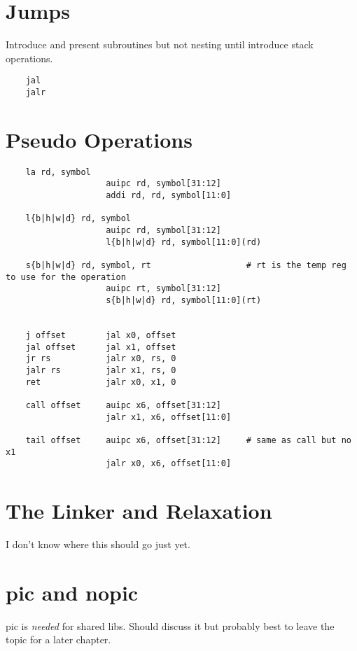 \section{Jumps}

Introduce and present subroutines but not nesting until introduce stack operations.

\begin{verbatim}
    jal
    jalr
\end{verbatim}



\section{Pseudo Operations}

%
\begin{verbatim}
    la rd, symbol
                    auipc rd, symbol[31:12]
                    addi rd, rd, symbol[11:0]

    l{b|h|w|d} rd, symbol
                    auipc rd, symbol[31:12]
                    l{b|h|w|d} rd, symbol[11:0](rd)

    s{b|h|w|d} rd, symbol, rt                   # rt is the temp reg to use for the operation
                    auipc rt, symbol[31:12]
                    s{b|h|w|d} rd, symbol[11:0](rt)


    j offset        jal x0, offset
    jal offset      jal x1, offset
    jr rs           jalr x0, rs, 0
    jalr rs         jalr x1, rs, 0
    ret             jalr x0, x1, 0

    call offset     auipc x6, offset[31:12]
                    jalr x1, x6, offset[11:0]

    tail offset     auipc x6, offset[31:12]     # same as call but no x1
                    jalr x0, x6, offset[11:0]
\end{verbatim}


\section{The Linker and Relaxation}

%
I don't know where this should go just yet.

\section{pic and nopic}

pic is {\em needed} for shared libs.  Should discuss it but probably best 
to leave the topic for a later chapter.
